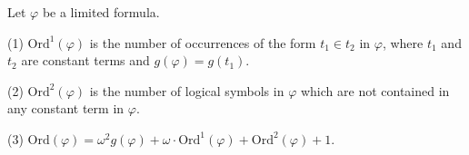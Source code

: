 Let $\varphi$ be a limited formula.

(1) $\text{Ord}^1(\varphi)$ is the number of occurrences of the form $t_1 \in t_2$ in $\varphi$, where $t_1$ and $t_2$ are constant terms and $g(\varphi) = g(t_1)$.

(2) $\text{Ord}^2(\varphi)$ is the number of logical symbols in $\varphi$ which are not contained in any constant term in $\varphi$.

(3) $\text{Ord}(\varphi) = \omega^2 g(\varphi) + \omega \cdot \text{Ord}^1(\varphi) + \text{Ord}^2(\varphi) + 1$.
